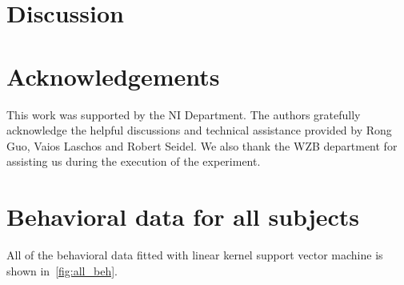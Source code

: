 \documentclass{article}
\begin{document}
\section{Discussion}\label{sec:discussion}


\section*{Acknowledgements}

This work was supported by the NI Department. The authors gratefully acknowledge the helpful discussions and technical assistance provided by Rong Guo, Vaios Laschos and Robert Seidel.
We also thank the WZB department for assisting us during the execution of the experiment.


\nocite{langley00}





\appendix
\section{Behavioral data for all subjects}
All of the behavioral data fitted with linear kernel support vector machine is shown in~\autoref{fig:all_beh}.
\end{document}
